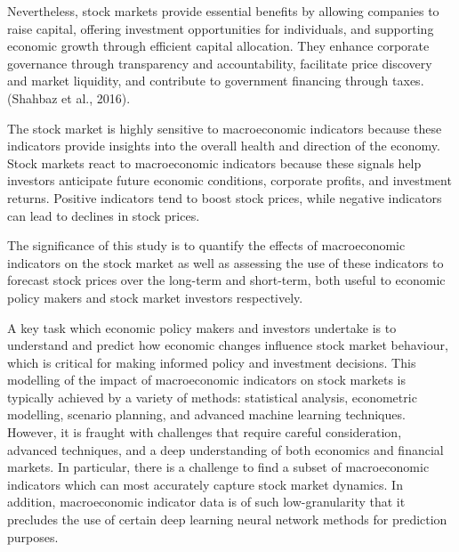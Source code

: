 \documentclass[11pt,a4paper]{article}
\begin{document}
Nevertheless, stock markets provide essential benefits by allowing companies to raise capital, offering investment opportunities for individuals, and supporting economic growth through efficient capital allocation. They enhance corporate governance through transparency and accountability, facilitate price discovery and market liquidity, and contribute to government financing through taxes.(Shahbaz et al., 2016). 

The stock market is highly sensitive to macroeconomic indicators because these indicators provide insights into the overall health and direction of the economy. Stock markets react to macroeconomic indicators because these signals help investors anticipate future economic conditions, corporate profits, and investment returns. Positive indicators tend to boost stock prices, while negative indicators can lead to declines in stock prices.

The significance of this study is to quantify the effects of macroeconomic indicators on the stock market as well as assessing the use of these indicators to forecast stock prices over the long-term and short-term, both useful to economic policy makers and stock market investors respectively.

A key task which economic policy makers and investors undertake is to understand and predict how economic changes influence stock market behaviour, which is critical for making informed policy and investment decisions. This modelling of the impact of macroeconomic indicators on stock markets is typically achieved by a variety of methods: statistical analysis, econometric modelling, scenario planning, and advanced machine learning techniques. However, it is fraught with challenges that require careful consideration, advanced techniques, and a deep understanding of both economics and financial markets. In particular, there is a challenge to find a subset of macroeconomic indicators which can most accurately capture stock market dynamics. 
In addition, macroeconomic indicator data is of such low-granularity that it precludes the use of certain deep learning neural network methods for prediction purposes.
\end{document}
